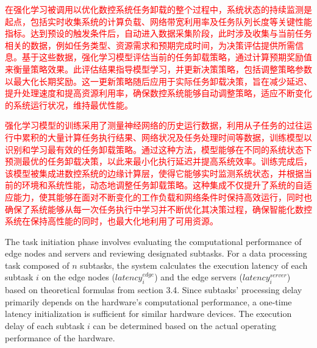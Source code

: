 \documentclass[preprint,12pt]{elsarticle}
\begin{document}
\textcolor{red}{在强化学习被调用以优化数控系统任务卸载的整个过程中，系统状态的持续监测是起点，包括实时收集系统的计算负载、网络带宽利用率及任务队列长度等关键性能指标。达到预设的触发条件后，自动进入数据采集阶段，此时涉及收集与当前任务相关的数据，例如任务类型、资源需求和预期完成时间，为决策评估提供所需信息。基于这些数据，强化学习模型评估当前的任务卸载策略，通过计算预期奖励值来衡量策略效果。此评估结果指导模型学习，并更新决策策略，包括调整策略参数以最大化长期奖励。这一更新策略随后应用于实际任务卸载决策，旨在减少延迟、提升处理速度和提高资源利用率，确保数控系统能够自动调整策略，适应不断变化的系统运行状况，维持最优性能。}

\textcolor{red}{强化学习模型的训练采用了测量神经网络的历史运行数据，利用从子任务的过往运行中累积的大量计算任务执行结果、网络状况及任务处理时间等数据，训练模型以识别和学习最有效的任务卸载策略。通过这种方法，模型能够在不同的系统状态下预测最优的任务卸载决策，以此来最小化执行延迟并提高系统效率。训练完成后，该模型被集成进数控系统的边缘计算层，使得它能够实时监测系统状态，并根据当前的环境和系统性能，动态地调整任务卸载策略。这种集成不仅提升了系统的自适应能力，使其能够在面对不断变化的工作负载和网络条件时保持高效运行，同时也确保了系统能够从每一次任务执行中学习并不断优化其决策过程，确保智能化数控系统在保持高性能的同时，也最大化地利用了可用资源。}

The task initiation phase involves evaluating the computational performance of edge nodes and servers and reviewing designated subtasks. For a data processing task composed of \(n\) subtasks, the system calculates the execution latency of each subtask \(i\) on the edge nodes (\(latency_i^{edge}\)) and the edge servers (\(latency_i^{server}\)) based on theoretical formulas from section 3.4. Since subtasks' processing delay primarily depends on the hardware's computational performance, a one-time latency initialization is sufficient for similar hardware devices. The execution delay of each subtask \(i\) can be determined based on the actual operating performance of the hardware.
\end{document}
